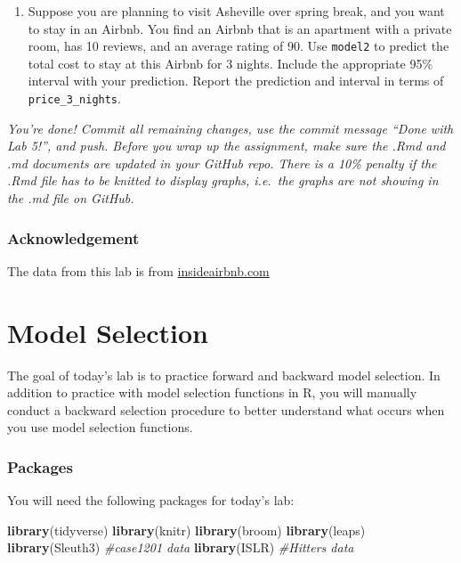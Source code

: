 \documentclass[]{book}
\newenvironment{Shaded}{\begin{snugshade}}{\end{snugshade}}
\newcommand{\KeywordTok}[1]{\textcolor[rgb]{0.13,0.29,0.53}{\textbf{#1}}}
\newcommand{\CommentTok}[1]{\textcolor[rgb]{0.56,0.35,0.01}{\textit{#1}}}
\newcommand{\NormalTok}[1]{#1}
\providecommand{\tightlist}{%
  \setlength{\itemsep}{0pt}\setlength{\parskip}{0pt}}
\begin{document}
\begin{enumerate}
\def\labelenumi{\arabic{enumi}.}
\setcounter{enumi}{14}
\tightlist
\item
  Suppose you are planning to visit Asheville over spring break, and you
  want to stay in an Airbnb. You find an Airbnb that is an apartment
  with a private room, has 10 reviews, and an average rating of 90. Use
  \texttt{model2} to predict the total cost to stay at this Airbnb for 3
  nights. Include the appropriate 95\% interval with your prediction.
  Report the prediction and interval in terms of
  \texttt{price\_3\_nights}.
\end{enumerate}

\emph{You're done! Commit all remaining changes, use the commit message
``Done with Lab 5!'', and push. Before you wrap up the assignment, make
sure the .Rmd and .md documents are updated in your GitHub repo. There
is a 10\% penalty if the .Rmd file has to be knitted to display graphs,
i.e.~the graphs are not showing in the .md file on GitHub.}

\subsection{Acknowledgement}\label{acknowledgement-1}

The data from this lab is from
\href{http://insideairbnb.com/index.html}{insideairbnb.com}

\chapter{Model Selection}\label{selection}

The goal of today's lab is to practice forward and backward model
selection. In addition to practice with model selection functions in R,
you will manually conduct a backward selection procedure to better
understand what occurs when you use model selection functions.

\subsection{Packages}\label{packages-5}

You will need the following packages for today's lab:

\begin{Shaded}
\begin{Highlighting}[]
\KeywordTok{library}\NormalTok{(tidyverse)}
\KeywordTok{library}\NormalTok{(knitr)}
\KeywordTok{library}\NormalTok{(broom)}
\KeywordTok{library}\NormalTok{(leaps)}
\KeywordTok{library}\NormalTok{(Sleuth3) }\CommentTok{#case1201 data}
\KeywordTok{library}\NormalTok{(ISLR) }\CommentTok{#Hitters data}
\end{Highlighting}
\end{Shaded}
\end{document}
